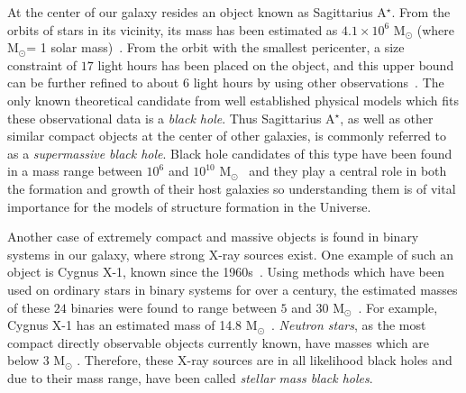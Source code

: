 At the center of our galaxy resides an object known as Sagittarius A$^\star$.
From the orbits of stars in its vicinity, its mass has been estimated as $4.1\times 10^6$ M$_\odot$ (where M$_\odot$= 1 solar mass)~\cite{Ghez:2008ms}.
From the orbit with the smallest pericenter, a size constraint of $17$ light hours has been placed on the object, and this upper bound can be further refined to about $6$ light hours by using other observations~\cite{Ghez:2003qj}.
The only known theoretical candidate from well established physical models which fits these observational data is a \textit{black hole}.
Thus Sagittarius A$^\star$, as well as other similar compact objects at the center of other galaxies, is commonly referred to as a \emph{supermassive black hole}.
Black hole candidates of this type have been found in a mass range between $10^6$ and $10^{10}$ M$_\odot$~\cite{Narayan:2013gca} and they play a central role in both the formation and growth of their host galaxies \cite{Kormendy:2013pja} so understanding them is of vital importance for the models of structure formation in the Universe.

Another case of extremely compact and massive objects is found in binary systems in our galaxy, where strong X-ray sources exist.
One example of such an object is Cygnus X-1, known since the 1960s~\cite{1965Sci...147..394B}.
Using methods which have been used on ordinary stars in binary systems for over a century, the estimated masses of these $24$ binaries were found to range between $5$ and $30$ M$_\odot$~\cite{Narayan:2013gca}.
For example, Cygnus X-1 has an estimated mass of 14.8 M$_\odot$~\cite{Reid:2011nn}.
\textit{Neutron stars}, as the most compact directly observable objects currently known, have masses which are below $3$ M$_\odot$ \cite{Kalogera:1996ci,Rhoades:1974fn}.
Therefore, these X-ray sources are in all likelihood black holes and due to their mass range, have been called \textit{stellar mass black holes}.

